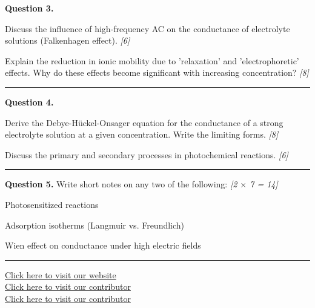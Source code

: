 \documentclass[11pt,a4paper]{article}
\newcommand{\pts}[1]{\hfill   \textit{[#1]}}
\begin{document}
\noindent   \textbf{Question 3.}

\begin{parts}
  \item Discuss the influence of high-frequency AC on the conductance of electrolyte solutions (Falkenhagen effect). \pts{6}
  \item Explain the reduction in ionic mobility due to 'relaxation' and 'electrophoretic' effects. Why do these effects become significant with increasing concentration? \pts{8}
\end{parts}

\medskip\rule{\linewidth}{0.2pt}




\noindent   \textbf{Question 4.}

\begin{parts}
  \item Derive the Debye-H\"uckel-Onsager equation for the conductance of a strong electrolyte solution at a given concentration. Write the limiting forms. \pts{8}
  \item Discuss the primary and secondary processes in photochemical reactions. \pts{6}
\end{parts}

\medskip\rule{\linewidth}{0.2pt}




\noindent   \textbf{Question 5.} Write short notes on any two of the following: \pts{2 $ \times$ 7 = 14}

\begin{parts}
  \item Photosensitized reactions
  \item Adsorption isotherms (Langmuir vs. Freundlich)
  \item Wien effect on conductance under high electric fields
\end{parts}

\vfill
\rule{\linewidth}{0.4pt}

\begin{center}\small
  \href{https://bhu-exam.vercel.app/}{Click here to visit our website}\\[4pt]
  \href{https://me-aryan.vercel.app/}{Click here to visit our contributor}\\[4pt]
  \href{https://quashan-me.vercel.app/}{Click here to visit our contributor}
\end{center}
\end{document}
